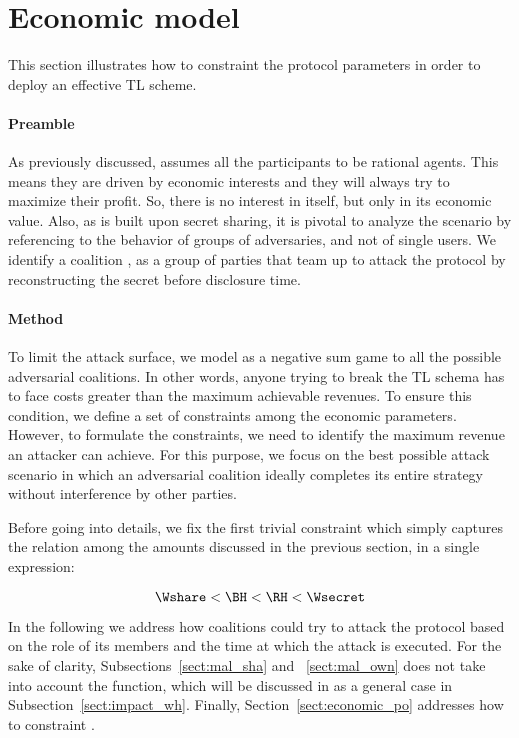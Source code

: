 \section{Economic model}\label{sect:constraints}


This section illustrates how to constraint the protocol parameters in order to deploy an effective TL scheme.

\paragraph*{Preamble}
As previously discussed, \shortname assumes all the participants to be rational agents. 
This means they are driven by economic interests and they will always try to maximize their profit. 
So, there is no interest in \secret itself, but only in its economic value.
%
Also, as \shortname is built upon secret sharing, it is pivotal to analyze the scenario by referencing to the behavior of groups of adversaries, and not of single users.
We identify a coalition \coalition, as a group of parties that team up to attack the protocol by reconstructing the secret before disclosure time.

\paragraph*{Method}
To limit the attack surface, we model \shortname as a negative sum game to all the possible adversarial coalitions. 
In other words, anyone trying to break the TL schema has to face costs greater than the maximum achievable revenues. 
To ensure this condition, we define a set of constraints among the economic parameters.
However, to formulate the constraints, we need to identify the maximum revenue an attacker can achieve.
For this purpose, we focus on the best possible attack scenario in which an adversarial coalition ideally completes its entire strategy without interference by other parties.

Before going into details, we fix the first trivial constraint which simply captures the relation among the amounts discussed in the previous section, in a single expression:

\begin{equation}\label{eqbase}
\Wshare < \BH < \RH < \Wsecret
\end{equation}

In the following we address how coalitions could try to attack the protocol based on the role of its members and the time at which the attack is executed.
For the sake of clarity, Subsections~\ref{sect:mal_sha} and ~\ref{sect:mal_own} does not take into account the \texttt{\algowhistleblowshare} function, which will be discussed in as a general case in Subsection~\ref{sect:impact_wh}.
Finally, Section~\ref{sect:economic_po} addresses how to constraint \PO.


